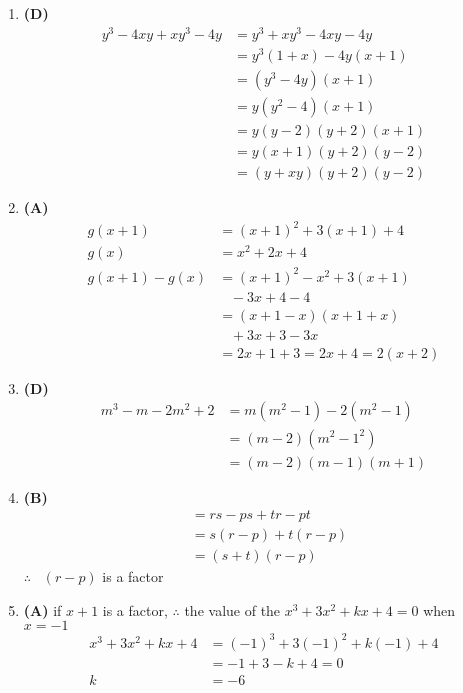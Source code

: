 \begin{multicols}{2}
\begin{enumerate}[label={\textbf{\arabic*.}}]
    \item \textbf{(D)} 
        \begin{align*}
            y^3 - 4xy + xy^3 - 4y &= y^3 + xy^3 - 4xy - 4y \\
            &= y^3(1 + x) - 4y (x + 1) \\
            &= (y^3 - 4y)(x + 1) \\
            &= y(y^2 - 4)(x + 1) \\
            &= y(y - 2)(y + 2)(x + 1) \\
            &= y(x + 1)(y + 2)(y - 2) \\
            &= (y + xy)(y + 2)(y - 2)
        \end{align*}
    
    \item \textbf{(A)} \begin{align*}
        g(x + 1) &= (x + 1) ^2 + 3(x + 1) + 4  \\
        g(x) & = x^2 + 2x + 4 \\
        g(x + 1) - g(x) & = (x+ 1)^2 - x^2 + 3(x+1)  \\
        & \hspace{10pt} - 3x + 4 - 4 \\
        & = (x + 1 - x)(x + 1 + x) \\
        &\hspace{10pt} + 3x + 3 - 3x \\
        & = 2x + 1 + 3 = 2x + 4 = 2(x + 2)
    \end{align*}
    \item \textbf{(D)} \begin{align*} 
        m^3 - m -2m^2 + 2 &= m(m^2 -1) -2 (m^2 -1) \\
        & = (m - 2)(m^2 - 1^2) \\
        & = (m-2)(m-1)(m+1)
    \end{align*}
    \item \textbf{(B)} \begin{align*} 
        & = rs -ps + tr - pt \\
        & = s(r-p) + t(r-p) \\
        & = (s + t)(r-p)
    \end{align*}
    $\therefore \hspace{10pt} (r-p) $ is a factor
    \item \textbf{(A)} if $x + 1$ is a factor, $\therefore$ the value of the $x^3 + 3x^2 + kx + 4 = 0$ when $x = -1$ \\
    \begin{align*}
        x^3 + 3x^2 + kx + 4 &= (-1)^3 + 3(-1)^2 +k(-1) + 4 \\
        & = -1 + 3 -k + 4 = 0 \\
        k & = -6 
    \end{align*}


\end{enumerate}
\end{multicols}
